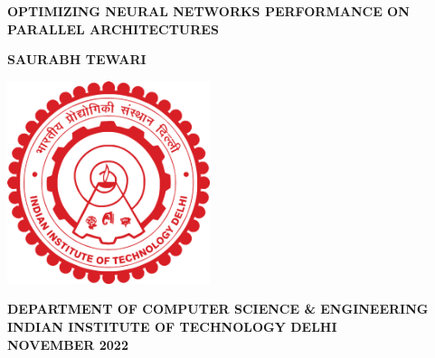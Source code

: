 \begin{titlepage}

\begin{center}


\LARGE 

\MakeUppercase{\textbf{OPTIMIZING NEURAL NETWORKS
		PERFORMANCE ON PARALLEL
		ARCHITECTURES}}\\

\vspace{3cm}

\LARGE

\textbf{SAURABH TEWARI} 

\vspace{6cm}
\hspace{0cm}
\hbox{\includegraphics[width=14pc]{ThesisSpecificPages/iitd-logo.pdf}}
\vspace{1cm}

\large{\bf DEPARTMENT OF COMPUTER SCIENCE \& ENGINEERING}\\
\large{\bf INDIAN INSTITUTE OF TECHNOLOGY DELHI}\\
\large{\bf NOVEMBER 2022}\\

\end{center}

\end{titlepage}

